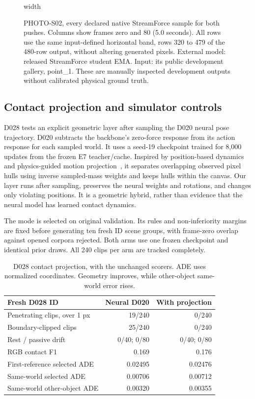 \documentclass[11pt,a4paper]{article}
\begin{document}
\clearpage
\begin{figure}[!ht]
\centering
\pdfximage width\linewidth{report/figures/photo_streamforce_native.png}\pdfrefximage\pdflastximage
\caption{PHOTO-S02, every declared native StreamForce sample for both pushes.
Columns show frames zero and 80 (5.0 seconds). All rows use the same
input-defined horizontal band, rows 320 to 479 of the 480-row output, without
altering generated pixels. External model: released StreamForce student EMA.
Input: its public development gallery, point\_1. These are manually inspected
development outputs without calibrated physical ground truth.}
\label{fig:photo-streamforce}
\end{figure}
\clearpage


\subsection{Contact projection and simulator controls}
\label{sec:contact-projection}
D028 tests an explicit geometric layer after sampling the D020 neural pose
trajectory. D020 subtracts the backbone's zero-force response from its action
response for each sampled world. It uses a seed-19 checkpoint trained for
8,000 updates from the frozen E7 teacher/cache. Inspired by position-based dynamics~\cite{pbd} and physics-guided
motion projection~\cite{physdiff}, it separates overlapping observed pixel
hulls using inverse sampled-mass weights and keeps hulls within the canvas.
Our layer runs after sampling, preserves the neural weights and rotations,
and changes only violating positions. It is a geometric hybrid, rather than
evidence that the neural model has learned contact dynamics.

The mode is selected on original validation. Its rules and non-inferiority
margins are fixed before generating ten fresh ID scene groups, with frame-zero
overlap against opened corpora rejected. Both arms use one frozen checkpoint
and identical prior draws. All 240 clips per arm are tracked completely.

\begin{table}[!ht]
\centering
\begin{tabular}{lrr}
\hline
Fresh D028 ID & Neural D020 & With projection \\
\hline
Penetrating clips, over 1 px & 19/240 & 0/240 \\
Boundary-clipped clips & 25/240 & 0/240 \\
Rest / passive drift & 0/40; 0/80 & 0/40; 0/80 \\
RGB contact F1 & 0.169 & 0.176 \\
First-reference selected ADE & 0.02495 & 0.02476 \\
Same-world selected ADE & 0.00706 & 0.00712 \\
Same-world other-object ADE & 0.00320 & 0.00355 \\
\hline
\end{tabular}
\caption{D028 contact projection, with the unchanged scorers. ADE uses normalized
coordinates. Geometry improves, while other-object same-world error rises.}
\label{tab:projection}
\end{table}
\end{document}
